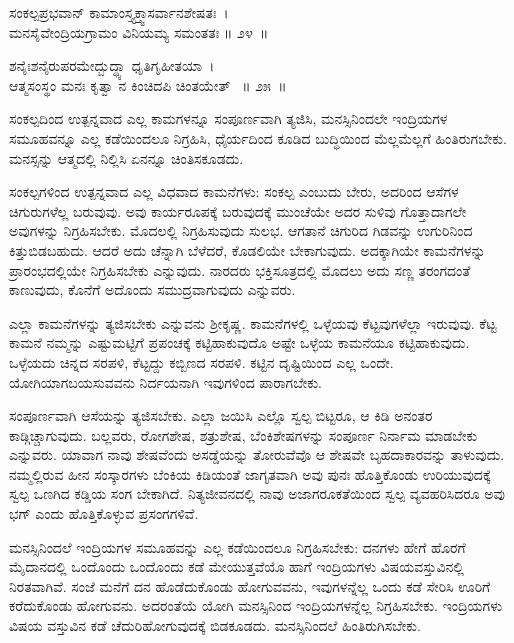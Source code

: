 \begin{shloka}
ಸಂಕಲ್ಪಪ್ರಭವಾನ್ ಕಾಮಾಂಸ್ತ್ಯಕ್ತ್ವಾಸರ್ವಾನಶೇಷತಃ~।\\ಮನಸೈವೇಂದ್ರಿಯಗ್ರಾಮಂ ವಿನಿಯಮ್ಯ ಸಮಂತತಃ \hfill॥ ೨೪~॥
\end{shloka}

\begin{shloka}
ಶನೈಃಶನೈರುಪರಮೇದ್ಬುದ್ಧ್ಯಾ ಧೃತಿಗೃಹೀತಯಾ~।\\ಆತ್ಮಸಂಸ್ಥಂ ಮನಃ ಕೃತ್ವಾ ನ ಕಿಂಚಿದಪಿ ಚಿಂತಯೇತ್ \hfill~॥ ೨೫~॥
\end{shloka}

\begin{artha}
ಸಂಕಲ್ಪದಿಂದ ಉತ್ಪನ್ನವಾದ ಎಲ್ಲ ಕಾಮಗಳನ್ನೂ ಸಂಪೂರ್ಣವಾಗಿ ತ್ಯಜಿಸಿ, ಮನಸ್ಸಿನಿಂದಲೇ ಇಂದ್ರಿಯಗಳ ಸಮೂಹವನ್ನೂ ಎಲ್ಲ ಕಡೆಯಿಂದಲೂ ನಿಗ್ರಹಿಸಿ, ಧೈರ್ಯದಿಂದ ಕೂಡಿದ ಬುದ್ಧಿಯಿಂದ ಮೆಲ್ಲಮೆಲ್ಲಗೆ ಹಿಂತಿರುಗಬೇಕು. ಮನಸ್ಸನ್ನು ಆತ್ಮದಲ್ಲಿ ನಿಲ್ಲಿಸಿ ಏನನ್ನೂ ಚಿಂತಿಸಕೂಡದು.
\end{artha}

ಸಂಕಲ್ಪಗಳಿಂದ ಉತ್ಪನ್ನವಾದ ಎಲ್ಲ ವಿಧವಾದ ಕಾಮನೆಗಳು: ಸಂಕಲ್ಪ ಎಂಬುದು ಬೇರು, ಅದರಿಂದ ಆಸೆಗಳ ಚಿಗುರುಗಳೆಲ್ಲ ಬರುವುವು. ಅವು ಕಾರ್ಯರೂಪಕ್ಕೆ ಬರುವುದಕ್ಕೆ ಮುಂಚೆಯೇ ಅದರ ಸುಳಿವು ಗೊತ್ತಾದಾಗಲೇ ಅವುಗಳನ್ನು ನಿಗ್ರಹಿಸಬೇಕು. ಮೊದಲಲ್ಲಿ ನಿಗ್ರಹಿಸುವುದು ಸುಲಭ. ಆಗತಾನೆ ಚಿಗುರಿದ ಗಿಡವನ್ನು ಉಗುರಿನಿಂದ ಕಿತ್ತುಬಿಡಬಹುದು. ಆದರೆ ಅದು ಚೆನ್ನಾಗಿ ಬೆಳೆದರೆ, ಕೊಡಲಿಯೇ ಬೇಕಾಗುವುದು. ಅದಕ್ಕಾಗಿಯೇ ಕಾಮನೆಗಳನ್ನು ಪ್ರಾರಂಭದಲ್ಲಿಯೇ ನಿಗ್ರಹಿಸಬೇಕು ಎನ್ನುವುದು. ನಾರದರು ಭಕ್ತಿಸೂತ್ರದಲ್ಲಿ ಮೊದಲು ಅದು ಸಣ್ಣ ತರಂಗದಂತೆ ಕಾಣುವುದು, ಕೊನೆಗೆ ಅದೊಂದು ಸಮುದ್ರವಾಗುವುದು ಎನ್ನುವರು.

ಎಲ್ಲಾ ಕಾಮನೆಗಳನ್ನು ತ್ಯಜಿಸಬೇಕು ಎನ್ನುವನು ಶ‍್ರೀಕೃಷ್ಣ. ಕಾಮನೆಗಳಲ್ಲಿ ಒಳ್ಳೆಯವು ಕೆಟ್ಟವುಗಳೆಲ್ಲಾ ಇರುವುವು. ಕೆಟ್ಟ ಕಾಮನೆ ನಮ್ಮನ್ನು ಎಷ್ಟುಮಟ್ಟಿಗೆ ಪ್ರಪಂಚಕ್ಕೆ ಕಟ್ಟಿಹಾಕುವುದೊ ಅಷ್ಟೇ ಒಳ್ಳೆಯ ಕಾಮನೆಯೂ ಕಟ್ಟಿಹಾಕುವುದು. ಒಳ್ಳೆಯದು ಚಿನ್ನದ ಸರಪಳಿ, ಕೆಟ್ಟದ್ದು ಕಬ್ಬಿಣದ ಸರಪಳಿ. ಕಟ್ಟಿನ ದೃಷ್ಟಿಯಿಂದ ಎಲ್ಲ ಒಂದೇ. ಯೋಗಿಯಾಗಬಯಸುವವನು ನಿರ್ದಯನಾಗಿ ಇವುಗಳಿಂದ ಪಾರಾಗಬೇಕು.

ಸಂಪೂರ್ಣವಾಗಿ ಆಸೆಯನ್ನು ತ್ಯಜಿಸಬೇಕು. ಎಲ್ಲಾ ಜಯಿಸಿ ಎಲ್ಲೊ ಸ್ವಲ್ಪ ಬಿಟ್ಟರೂ, ಆ ಕಿಡಿ ಅನಂತರ ಕಾಡ್ಗಿಚ್ಚಾಗುವುದು. ಬಲ್ಲವರು, ರೋಗಶೇಷ, ಶತ್ರುಶೇಷ, ಬೆಂಕಿಶೇಷಗಳನ್ನು ಸಂಪೂರ್ಣ ನಿರ್ನಾಮ ಮಾಡಬೇಕು ಎನ್ನುವರು. ಯಾವಾಗ ನಾವು ಶೇಷವೆಂದು ಅಸಡ್ಡೆಯನ್ನು ತೋರುವೆವೊ ಆ ಶೇಷವೇ ಬೃಹದಾಕಾರವನ್ನು ತಾಳುವುದು. ನಮ್ಮಲ್ಲಿರುವ ಹೀನ ಸಂಸ್ಕಾರಗಳು ಬೆಂಕಿಯ ಕಿಡಿಯಂತೆ ಜಾಗೃತವಾಗಿ ಅವು ಪುನಃ ಹೊತ್ತಿಕೊಂಡು ಉರಿಯುವುದಕ್ಕೆ ಸ್ವಲ್ಪ ಒಣಗಿದ ಕಡ್ಡಿಯ ಸಂಗ ಬೇಕಾಗಿದೆ. ನಿತ್ಯಜೀವನದಲ್ಲಿ ನಾವು ಅಜಾಗರೂಕತೆಯಿಂದ ಸ್ವಲ್ಪ ವ್ಯವಹರಿಸಿದರೂ ಅವು ಭಗ್ ಎಂದು ಹೊತ್ತಿಕೊಳ್ಳುವ ಪ್ರಸಂಗಗಳಿವೆ.

ಮನಸ್ಸಿನಿಂದಲೆ ಇಂದ್ರಿಯಗಳ ಸಮೂಹವನ್ನು ಎಲ್ಲ ಕಡೆಯಿಂದಲೂ ನಿಗ್ರಹಿಸಬೇಕು: ದನಗಳು ಹೇಗೆ ಹೊರಗೆ ಮೈದಾನದಲ್ಲಿ ಒಂದೊಂದು ಒಂದೊಂದು ಕಡೆ ಮೇಯುತ್ತವೆಯೊ ಹಾಗೆ ಇಂದ್ರಿಯಗಳು ವಿಷಯವಸ್ತುವಿನಲ್ಲಿ ನಿರತವಾಗಿವೆ. ಸಂಜೆ ಮನೆಗೆ ದನ ಹೊಡೆದುಕೊಂಡು ಹೋಗುವವನು, ಇವುಗಳನ್ನೆಲ್ಲ ಒಂದು ಕಡೆ ಸೇರಿಸಿ ಊರಿಗೆ ಕರೆದುಕೊಂಡು ಹೋಗುವನು. ಅದರಂತೆಯೆ ಯೋಗಿ ಮನಸ್ಸಿನಿಂದ ಇಂದ್ರಿಯಗಳನ್ನೆಲ್ಲ ನಿಗ್ರಹಿಸಬೇಕು. ಇಂದ್ರಿಯಗಳು ವಿಷಯ ವಸ್ತುವಿನ ಕಡೆ ಚೆದುರಿಹೋಗುವುದಕ್ಕೆ ಬಿಡಕೂಡದು. ಮನಸ್ಸಿನಿಂದಲೆ ಹಿಂತಿರುಗಿಸಬೇಕು.

